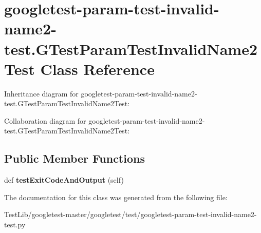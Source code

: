 \hypertarget{classgoogletest-param-test-invalid-name2-test_1_1GTestParamTestInvalidName2Test}{}\section{googletest-\/param-\/test-\/invalid-\/name2-\/test.G\+Test\+Param\+Test\+Invalid\+Name2\+Test Class Reference}
\label{classgoogletest-param-test-invalid-name2-test_1_1GTestParamTestInvalidName2Test}


Inheritance diagram for googletest-\/param-\/test-\/invalid-\/name2-\/test.G\+Test\+Param\+Test\+Invalid\+Name2\+Test\+:


Collaboration diagram for googletest-\/param-\/test-\/invalid-\/name2-\/test.G\+Test\+Param\+Test\+Invalid\+Name2\+Test\+:
\subsection*{Public Member Functions}
\begin{DoxyCompactItemize}
\item 
\mbox{\label{classgoogletest-param-test-invalid-name2-test_1_1GTestParamTestInvalidName2Test_a3fbc22a46315dc7ba10f0203349de7c7}} 
def {\bfseries test\+Exit\+Code\+And\+Output} (self)
\end{DoxyCompactItemize}


The documentation for this class was generated from the following file\+:\begin{DoxyCompactItemize}
\item 
Test\+Lib/googletest-\/master/googletest/test/googletest-\/param-\/test-\/invalid-\/name2-\/test.\+py\end{DoxyCompactItemize}

